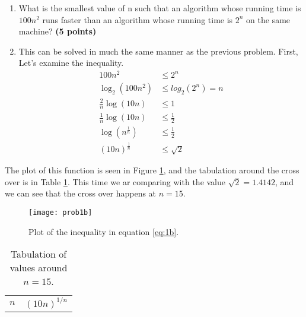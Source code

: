 \documentclass{article}
\begin{document}
\begin{enumerate}[label=(\alph*)]
\item  What is the smallest value of n such that an algorithm whose
running time is $100n^2$ runs faster than an algorithm whose running
time is $2^n$ on the same machine? {\bf (5 points) }
\item[] This can be solved in much the same manner as the previous
  problem. First, Let's examine the inequality.
  \begin{equation}\label{eq:1b}
    \begin{split}
      100 n^2 & \le 2^n\\
      \log_2(100n^2) & \le log_2(2^n) = n\\
      \frac{2}{n} \log(10n) &\le 1\\
      \frac{1}{n} \log(10n) &\le \frac1 2\\
      \log\left(n^{\frac{1}{n}}\right) &\le \frac{1}{2}\\
      \left(10n\right)^{\frac{1}{n}} &\le \sqrt{2}
    \end{split}
  \end{equation}
\end{enumerate} 

The plot of this function is seen in Figure \ref{fig:1b}, and the
tabulation around the cross over is in Table \ref{tab:1b}.  This time
we ar comparing with the value $\sqrt{2} = 1.4142$, and we can see
that the cross over happens at $n=15$.
\begin{figure}[h!t]
  \centering
  \texttt{[image: prob1b]}
  \caption{Plot of the inequality in equation \ref{eq:1b}.}
  \label{fig:1b}
\end{figure}

\begin{table}[h!t]
  \centering
  \caption{Tabulation of values around $n=15$.}
  \label{tab:1b}
  \begin{tabular}[h]{cc}
    $n$ & $(10n)^{1/n}$ \\
    
  \end{tabular}
\end{table}

\vspace{3em}
\end{document}
